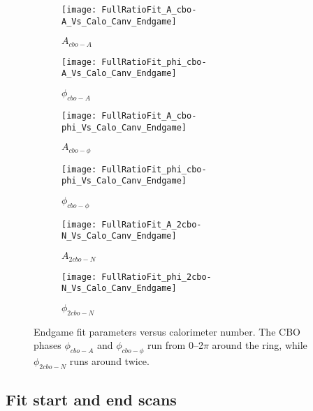 \begin{figure}[]
\centering
    \begin{subfigure}[]{0.45\textwidth}
        \centering
        \texttt{[image: FullRatioFit\_A\_cbo-A\_Vs\_Calo\_Canv\_Endgame]}
        \caption{$A_{cbo-A}$}
    \end{subfigure}%
    \begin{subfigure}[]{0.45\textwidth}
        \centering
        \texttt{[image: FullRatioFit\_phi\_cbo-A\_Vs\_Calo\_Canv\_Endgame]}
        \caption{$\phi_{cbo-A}$}
    \end{subfigure}

    \begin{subfigure}[]{0.45\textwidth}
        \centering
        \texttt{[image: FullRatioFit\_A\_cbo-phi\_Vs\_Calo\_Canv\_Endgame]}
        \caption{$A_{cbo-\phi}$}
    \end{subfigure}%
    \begin{subfigure}[]{0.45\textwidth}
        \centering
        \texttt{[image: FullRatioFit\_phi\_cbo-phi\_Vs\_Calo\_Canv\_Endgame]}
        \caption{$\phi_{cbo-\phi}$}
    \end{subfigure}

    \begin{subfigure}[]{0.45\textwidth}
        \centering
        \texttt{[image: FullRatioFit\_A\_2cbo-N\_Vs\_Calo\_Canv\_Endgame]}
        \caption{$A_{2cbo-N}$}
    \end{subfigure}%
    \begin{subfigure}[]{0.45\textwidth}
        \centering
        \texttt{[image: FullRatioFit\_phi\_2cbo-N\_Vs\_Calo\_Canv\_Endgame]}
        \caption{$\phi_{2cbo-N}$}
    \end{subfigure}
\caption[Endgame fit parameters versus calorimeter number]{Endgame fit parameters versus calorimeter number. The CBO phases $\phi_{cbo-A}$ and $\phi_{cbo-\phi}$ run from 0--2$\pi$ around the ring, while $\phi_{2cbo-N}$ runs around twice.}
\label{fig:fig:caloFits_EndgamePars_2}
\end{figure}


\clearpage

\subsection{Fit start and end scans}


